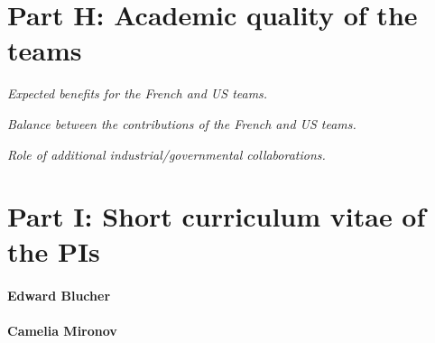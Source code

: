 \section{Part H: Academic quality of the teams}



\textit{Expected benefits for the French and US teams.} 

\textit{Balance between the contributions of the French and US teams.}

\textit{Role of additional industrial/governmental collaborations.}


\section{Part I: Short curriculum vitae of the PIs}

\paragraph{Edward Blucher}


\paragraph{Camelia Mironov}

\clearpage


